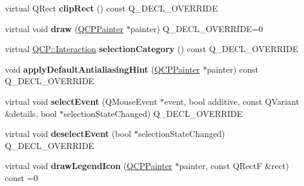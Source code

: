 \begin{DoxyCompactItemize}
\item 
virtual Q\+Rect {\bfseries clip\+Rect} () const Q\+\_\+\+D\+E\+C\+L\+\_\+\+O\+V\+E\+R\+R\+I\+DE\hypertarget{classQCPAbstractPlottable_a635cee3effc07ad421414c76fd83548c}{}\label{classQCPAbstractPlottable_a635cee3effc07ad421414c76fd83548c}

\item 
virtual void {\bfseries draw} (\hyperlink{classQCPPainter}{Q\+C\+P\+Painter} $\ast$painter) Q\+\_\+\+D\+E\+C\+L\+\_\+\+O\+V\+E\+R\+R\+I\+DE=0\hypertarget{classQCPAbstractPlottable_a453f676a5cee7bf846c5f0fa05ea84b3}{}\label{classQCPAbstractPlottable_a453f676a5cee7bf846c5f0fa05ea84b3}

\item 
virtual \hyperlink{namespaceQCP_a2ad6bb6281c7c2d593d4277b44c2b037}{Q\+C\+P\+::\+Interaction} {\bfseries selection\+Category} () const Q\+\_\+\+D\+E\+C\+L\+\_\+\+O\+V\+E\+R\+R\+I\+DE\hypertarget{classQCPAbstractPlottable_af80ad8531642e786b6f4fad551c203c4}{}\label{classQCPAbstractPlottable_af80ad8531642e786b6f4fad551c203c4}

\item 
void {\bfseries apply\+Default\+Antialiasing\+Hint} (\hyperlink{classQCPPainter}{Q\+C\+P\+Painter} $\ast$painter) const Q\+\_\+\+D\+E\+C\+L\+\_\+\+O\+V\+E\+R\+R\+I\+DE\hypertarget{classQCPAbstractPlottable_ac032077fb0db93d6faa3273d02363398}{}\label{classQCPAbstractPlottable_ac032077fb0db93d6faa3273d02363398}

\item 
virtual void {\bfseries select\+Event} (Q\+Mouse\+Event $\ast$event, bool additive, const Q\+Variant \&details, bool $\ast$selection\+State\+Changed) Q\+\_\+\+D\+E\+C\+L\+\_\+\+O\+V\+E\+R\+R\+I\+DE\hypertarget{classQCPAbstractPlottable_a2d488568cf16600dd81fa23d7d439829}{}\label{classQCPAbstractPlottable_a2d488568cf16600dd81fa23d7d439829}

\item 
virtual void {\bfseries deselect\+Event} (bool $\ast$selection\+State\+Changed) Q\+\_\+\+D\+E\+C\+L\+\_\+\+O\+V\+E\+R\+R\+I\+DE\hypertarget{classQCPAbstractPlottable_a9b104d9da4f38f934363945c313bf82e}{}\label{classQCPAbstractPlottable_a9b104d9da4f38f934363945c313bf82e}

\item 
virtual void {\bfseries draw\+Legend\+Icon} (\hyperlink{classQCPPainter}{Q\+C\+P\+Painter} $\ast$painter, const Q\+RectF \&rect) const =0\hypertarget{classQCPAbstractPlottable_a9a450783fd9ed539e589999fd390cdf7}{}\label{classQCPAbstractPlottable_a9a450783fd9ed539e589999fd390cdf7}


\end{DoxyCompactItemize}

